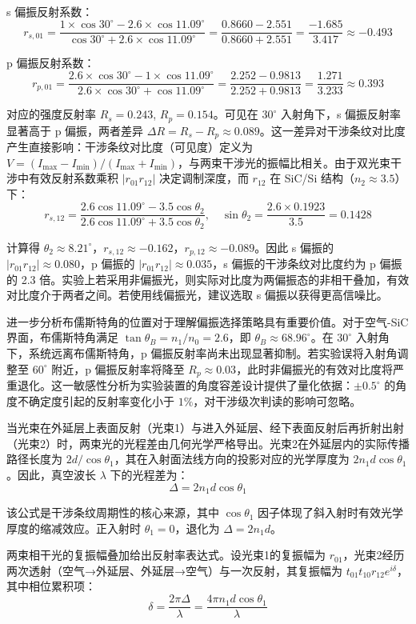 \documentclass{mcmthesis}
\begin{document}
\begin{table}[htbp]
s 偏振反射系数：
$$r_{s,01} = \frac{1\times\cos 30^\circ - 2.6\times\cos 11.09^\circ}{\cos 30^\circ + 2.6\times\cos 11.09^\circ} = \frac{0.8660 - 2.551}{0.8660 + 2.551} = \frac{-1.685}{3.417} \approx -0.493$$

p 偏振反射系数：
$$r_{p,01} = \frac{2.6\times\cos 30^\circ - 1\times\cos 11.09^\circ}{2.6\times\cos 30^\circ + \cos 11.09^\circ} = \frac{2.252 - 0.9813}{2.252 + 0.9813} = \frac{1.271}{3.233} \approx 0.393$$

对应的强度反射率 $R_s = 0.243$, $R_p = 0.154$。可见在 $30^\circ$ 入射角下，s 偏振反射率显著高于 p 偏振，两者差异 $\Delta R = R_s - R_p \approx 0.089$。这一差异对干涉条纹对比度产生直接影响：干涉条纹对比度（可见度）定义为 $V = (I_{\max} - I_{\min})/(I_{\max} + I_{\min})$，与两束干涉光的振幅比相关。由于双光束干涉中有效反射系数乘积 $|r_{01}r_{12}|$ 决定调制深度，而 $r_{12}$ 在 SiC/Si 结构（$n_2 \approx 3.5$）下：
$$r_{s,12} = \frac{2.6\cos 11.09^\circ - 3.5\cos\theta_2}{2.6\cos 11.09^\circ + 3.5\cos\theta_2}, \quad \sin\theta_2 = \frac{2.6\times 0.1923}{3.5} = 0.1428$$

计算得 $\theta_2 \approx 8.21^\circ$，$r_{s,12} \approx -0.162$，$r_{p,12} \approx -0.089$。因此 s 偏振的 $|r_{01}r_{12}| \approx 0.080$，p 偏振的 $|r_{01}r_{12}| \approx 0.035$，s 偏振的干涉条纹对比度约为 p 偏振的 2.3 倍。实验上若采用非偏振光，则实际对比度为两偏振态的非相干叠加，有效对比度介于两者之间。若使用线偏振光，建议选取 s 偏振以获得更高信噪比。

进一步分析布儒斯特角的位置对于理解偏振选择策略具有重要价值。对于空气-SiC 界面，布儒斯特角满足 $\tan\theta_B = n_1/n_0 = 2.6$，即 $\theta_B \approx 68.96^\circ$。在 $30^\circ$ 入射角下，系统远离布儒斯特角，p 偏振反射率尚未出现显著抑制。若实验误将入射角调整至 $60^\circ$ 附近，p 偏振反射率将降至 $R_p \approx 0.03$，此时非偏振光的有效对比度将严重退化。这一敏感性分析为实验装置的角度容差设计提供了量化依据：$\pm 0.5^\circ$ 的角度不确定度引起的反射率变化小于 $1\%$，对干涉级次判读的影响可忽略。

当光束在外延层上表面反射（光束1）与进入外延层、经下表面反射后再折射出射（光束2）时，两束光的光程差由几何光学严格导出。光束2在外延层内的实际传播路径长度为 $2d/\cos\theta_1$，其在入射面法线方向的投影对应的光学厚度为 $2n_1 d\cos\theta_1$。因此，真空波长 $\lambda$ 下的光程差为：
$$\Delta = 2n_1 d\cos\theta_1 \tag{7}$$

该公式是干涉条纹周期性的核心来源，其中 $\cos\theta_1$ 因子体现了斜入射时有效光学厚度的缩减效应。正入射时 $\theta_1 = 0$，退化为 $\Delta = 2n_1 d$。

两束相干光的复振幅叠加给出反射率表达式。设光束1的复振幅为 $r_{01}$，光束2经历两次透射（空气→外延层、外延层→空气）与一次反射，其复振幅为 $t_{01}t_{10}r_{12}e^{i\delta}$，其中相位累积项：
$$\delta = \frac{2\pi\Delta}{\lambda} = \frac{4\pi n_1 d\cos\theta_1}{\lambda} \tag{8}$$


\end{table}
\end{document}
